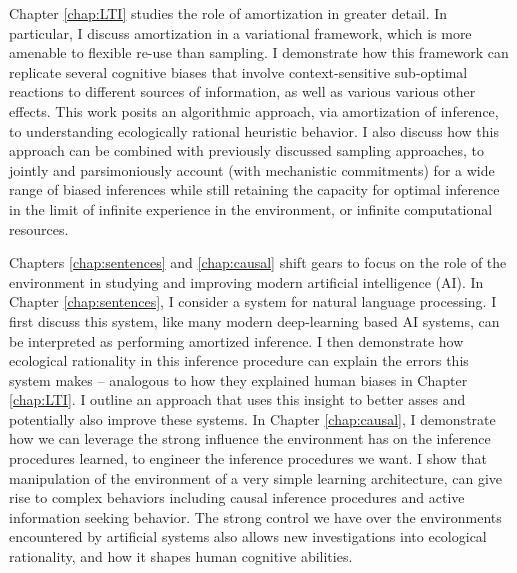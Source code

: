 Chapter \ref{chap:LTI} studies the role of amortization in greater detail. In particular, I discuss amortization in a variational framework, which is more amenable to flexible re-use than sampling. I demonstrate how this framework can replicate several cognitive biases that involve context-sensitive sub-optimal reactions to different sources of information, 
as well as various various other effects.
This work posits an algorithmic approach, via amortization of inference, to understanding ecologically rational heuristic behavior. I also discuss how this approach can be combined with previously discussed sampling approaches, to jointly and parsimoniously account (with mechanistic commitments) for a wide range of biased inferences while still retaining the capacity for optimal inference in the limit of infinite experience in the environment, or infinite computational resources.

Chapters \ref{chap:sentences} and \ref{chap:causal} shift gears to focus on the role of the environment in studying and improving modern artificial intelligence (AI).  In Chapter \ref{chap:sentences}, I consider a system for natural language processing. I first discuss this system, like many modern deep-learning based AI systems, can be interpreted as performing amortized inference. I then demonstrate how ecological rationality in this inference procedure can explain the errors this system makes -- analogous to how they explained human biases in Chapter \ref{chap:LTI}. I outline an approach that uses this insight to better asses and potentially also improve these systems. In Chapter \ref{chap:causal}, I demonstrate how we can leverage the strong influence the environment has on the inference procedures learned, to engineer the inference procedures we want. I show that manipulation of the environment of a very simple learning architecture, can give rise to complex behaviors including causal inference procedures and active information seeking behavior. The strong control we have over the environments encountered by artificial systems also allows new investigations into ecological rationality, and how it shapes human cognitive abilities.
